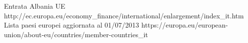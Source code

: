 \begin{thebibliography}{99}
	 Entrata Albania UE \newline http://ec.europa.eu/economy\_finance/international/enlargement/index\_it.htm
	 Lista paesi europei aggiornata al 01/07/2013 \newline https://europa.eu/european-union/about-eu/countries/member-countries\_it
\end{thebibliography}